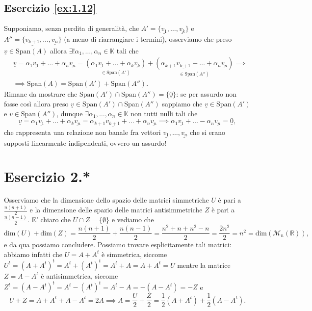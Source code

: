 \subsection*{Esercizio \ref{ex:1.12}}
Supponiamo, senza perdita di generalità, che $A' = \{ \underline{v_1}, \ldots, \underline{v_k} \}$ e $A'' = \{ \underline{v_{k+1}}, \ldots, \underline{v_n} \}$ (a meno di riarrangiare i termini), osserviamo che preso $\underline{v} \in \text{Span}(A)$ allora $\exists! \alpha_1, \ldots, \alpha_n \in \mathbb{K}$ tali che
\begin{align}
    &\underline{v} = \alpha_1 \underline{v_1} + \ldots + \alpha_n \underline{v_n} = \underset{\in \text{Span}(A')}{(\alpha_1 \underline{v_1} + \ldots + \alpha_k \underline{v_k})} + \underset{\in \text{Span}(A'')}{(\alpha_{k+1} \underline{v_{k+1}} + \ldots + \alpha_n \underline{v_n})} \implies \\
    &\implies \text{Span}(A) = \text{Span}(A') + \text{Span}(A'').
\end{align}
Rimane da mostrare che $\text{Span}(A') \cap \text{Span}(A'') = \{ \underline{0} \}$: se per assurdo non fosse così allora preso $\underline{v} \in \text{Span}(A') \cap \text{Span}(A'')$ sappiamo che $\underline{v} \in \text{Span}(A')$ e $\underline{v} \in \text{Span}(A'')$, dunque $\exists \alpha_1, \ldots, \alpha_n \in \mathbb{K}$ non tutti nulli tali che
$$
    \underline{v} = \alpha_1 \underline{v_1} + \ldots + \alpha_k \underline{v_n} = \alpha_{k+1} \underline{v_{k+1}} + \ldots + \alpha_n \underline{v_n} \implies \alpha_1 \underline{v_1} + \ldots - \alpha_n \underline{v_n} = \underline{0},
$$
che rappresenta una relazione non banale fra vettori $\underline{v_1}, \ldots, \underline{v_n}$ che si erano supposti linearmente indipendenti, ovvero un assurdo!

\section*{Esercizio 2.*}
Osserviamo che la dimensione dello spazio delle matrici simmetriche $U$ è pari a $\frac{n(n+1)}{2}$ e la dimensione delle spazio delle matrici antisimmetriche $Z$ è pari a $\frac{n(n-1)}{2}$. E' chiaro che $U \cap Z = \{ \emptyset \}$ e vediamo che
$$
    \text{dim}(U) + \text{dim}(Z) = \frac{n(n+1)}{2} + \frac{n(n-1)}{2} = \frac{n^2 + n + n^2 - n}{2} = \frac{2n^2}{2} = n^2 = \text{dim}(\mathcal{M}_n(\mathbb{R})),
$$
e da qua possiamo concludere. Possiamo trovare esplicitamente tali matrici: abbiamo infatti che $U = A + A^t$ è simmetrica, siccome $U^t = (A + A^t)^t = A^t + (A^t)^t = A^t + A = A + A^t = U$ mentre la matrice $Z = A - A^t$ è antisimmetrica, siccome $Z^t = (A - A^t)^t = A^t - (A^t)^t = A^t - A = - (A - A^t) = - Z$ e
$$
    U + Z = A + A^t + A - A^t = 2A \implies A = \frac{U}{2} + \frac{Z}{2} = \frac{1}{2}(A+A^t) + \frac{1}{2}(A - A^t).
$$
